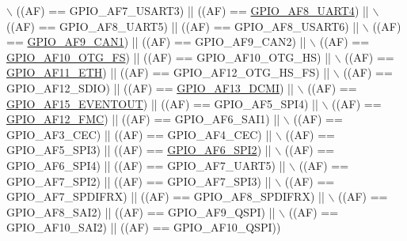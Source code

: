 \begin{DoxyCode}
      \(\backslash\)
                          ((AF) == GPIO\_AF7\_USART3)     || ((AF) == 
      \hyperlink{group___g_p_i_o___alternate__function__selection_gae634fa0570cb4bc20217130da41737e1}{GPIO\_AF8\_UART4})      || \(\backslash\)
                          ((AF) == GPIO\_AF8\_UART5)      || ((AF) == GPIO\_AF8\_USART6)     || \(\backslash\)
                          ((AF) == \hyperlink{group___g_p_i_o___alternate__function__selection_gaf4de931f6e3550743de69176a7f2935a}{GPIO\_AF9\_CAN1})       || ((AF) == GPIO\_AF9\_CAN2)       || \(\backslash\)
                          ((AF) == \hyperlink{group___g_p_i_o___alternate__function__selection_ga0c727c03ab97a835f283684de45fbcdb}{GPIO\_AF10\_OTG\_FS})    || ((AF) == GPIO\_AF10\_OTG\_HS)    ||
       \(\backslash\)
                          ((AF) == \hyperlink{group___g_p_i_o___alternate__function__selection_gab9bfa13073fb15e839b71653b51c864a}{GPIO\_AF11\_ETH})       || ((AF) == GPIO\_AF12\_OTG\_HS\_FS) || \(\backslash\)
                          ((AF) == GPIO\_AF12\_SDIO)      || ((AF) == 
      \hyperlink{group___g_p_i_o___alternate__function__selection_gac7ccbdfe96d75805d7fc7dcd821d0fb4}{GPIO\_AF13\_DCMI})      || \(\backslash\)
                          ((AF) == \hyperlink{group___g_p_i_o___alternate__function__selection_ga6a9e7cd61d906b36a1044acef59d245e}{GPIO\_AF15\_EVENTOUT})  || ((AF) == GPIO\_AF5\_SPI4)       
      || \(\backslash\)
                          ((AF) == \hyperlink{group___g_p_i_o___alternate__function__selection_ga56d7cc07c907d85e043eb44e4b9b4540}{GPIO\_AF12\_FMC})       ||  ((AF) == GPIO\_AF6\_SAI1)      || \(\backslash\)
                          ((AF) == GPIO\_AF3\_CEC)        ||  ((AF) == GPIO\_AF4\_CEC)       || \(\backslash\)
                          ((AF) == GPIO\_AF5\_SPI3)       ||  ((AF) == 
      \hyperlink{group___g_p_i_o___alternate__function__selection_ga1da9c47feac80dcd9b9b9e3ca0d8f07e}{GPIO\_AF6\_SPI2})      || \(\backslash\)
                          ((AF) == GPIO\_AF6\_SPI4)       ||  ((AF) == GPIO\_AF7\_UART5)     || \(\backslash\)
                          ((AF) == GPIO\_AF7\_SPI2)       ||  ((AF) == GPIO\_AF7\_SPI3)      || \(\backslash\)
                          ((AF) == GPIO\_AF7\_SPDIFRX)    ||  ((AF) == GPIO\_AF8\_SPDIFRX)   || \(\backslash\)
                          ((AF) == GPIO\_AF8\_SAI2)       ||  ((AF) == GPIO\_AF9\_QSPI)      || \(\backslash\)
                          ((AF) == GPIO\_AF10\_SAI2)      ||  ((AF) == GPIO\_AF10\_QSPI))
\end{DoxyCode}
